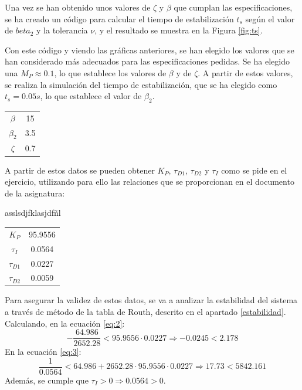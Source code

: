 \documentclass[a4paper]{article}
\begin{document}
Una vez se han obtenido unos valores de $\zeta$ y $\beta$ que cumplan las especificaciones, se ha creado un código para calcular el tiempo de estabilización $t_s$ según el valor de $beta_2$ y la tolerancia $\nu$, y el resultado se muestra en la Figura \ref{fig:ts}.

Con este código y viendo las gráficas anteriores, se han elegido los valores que se han considerado más adecuados para las especificaciones pedidas. Se ha elegido una $M_P \approx 0.1$, lo que establece los valores de $\beta$ y de $\zeta$. A partir de estos valores, se realiza la simulación del tiempo de estabilización, que se ha elegido como $t_s = 0.05 s$, lo que establece el valor de $\beta_2$.

\begin{center}
	\begin{tabular}{c|c}
			$\beta$ & 15 \\
			$\beta_2$ & 3.5 \\
			$\zeta$ & 0.7 \\
	\end{tabular}
\end{center}

A partir de estos datos se pueden obtener $K_P$, $\tau_{D1}$, $\tau_{D2}$ y $\tau_I$ como se pide en el ejercicio, utilizando para ello las relaciones que se proporcionan en el documento de la asignatura:



asslsdjfklasjdfñl



\begin{center}
	\begin{tabular}{c|c}
		$K_P$ & 95.9556 \\
		$\tau_I$ & 0.0564 \\
		$\tau_{D1}$ & 0.0227 \\
		$\tau_{D2}$ & 0.0059 \\
	\end{tabular}
\end{center}

Para asegurar la validez de estos datos, se va a analizar la estabilidad del sistema a través de método de la tabla de Routh, descrito en el apartado \ref{estabilidad}.
Calculando, en la ecuación \ref{eq:2}:
\begin{equation}
	-\frac{64.986}{2652.28}< 95.9556\cdot0.0227 \Rightarrow
	-0.0245<2.178
\end{equation}
En la ecuación \ref{eq:3}:
\begin{equation}
	\frac{1}{0.0564} < 64.986+2652.28\cdot95.9556\cdot0.0227 \Rightarrow
	17.73<5842.161
\end{equation}
Además, se cumple que $\tau_I > 0 \Rightarrow 0.0564>0$.
\end{document}
